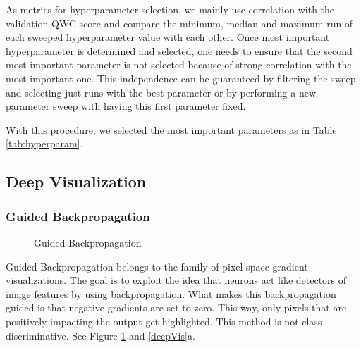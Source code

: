 \documentclass{article}
\begin{document}
As metrics for hyperparameter selection, we mainly use correlation with the validation-QWC-score and 
compare the minimum, median and maximum run of each sweeped hyperparameter value with each other. 
Once most important hyperparameter is determined and selected, one needs to ensure that the second most important
parameter is not selected because of strong correlation with the most important one. This independence can be 
guaranteed by filtering the sweep and selecting just runs with the best parameter or by performing a new parameter sweep
with having this first parameter fixed.

With this procedure, we selected the most important parameters as in Table \ref{tab:hyperparam}.





\subsection{Deep Visualization}
\subsubsection{Guided Backpropagation}
\begin{figure}%
  \vspace{-50pt}
  \centering
  \hspace{0.5cm}
  \caption{Guided Backpropagation}
  \label{guidedBackprop}
\end{figure}
Guided Backpropagation\cite{springenberg2015striving} belongs to the family of pixel-space gradient visualizations. 
The goal is to exploit the idea that neurons act like detectors of image features by using backpropagation.
What makes this backpropagation guided is that negative gradients are set to zero. This way, only pixels that are positively impacting 
the output get highlighted. This method is not class-discriminative. See Figure \ref{guidedBackprop} and \ref{deepVis}a.
\end{document}

